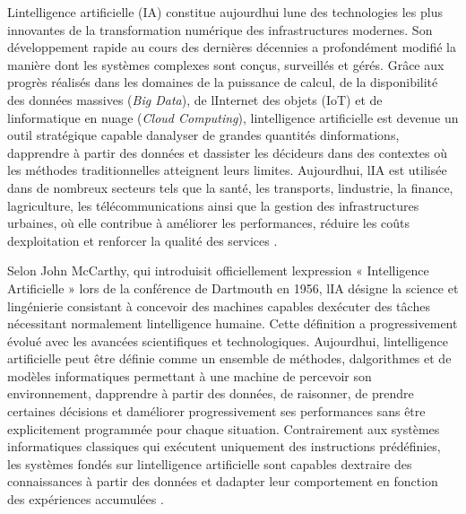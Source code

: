 \documentclass[12pt,a4paper,oneside]{report}
\begin{document}
L\textquotesingle intelligence artificielle (IA) constitue
aujourd\textquotesingle hui l\textquotesingle une des technologies les
plus innovantes de la transformation numérique des infrastructures
modernes. Son développement rapide au cours des dernières décennies a
profondément modifié la manière dont les systèmes complexes sont conçus,
surveillés et gérés. Grâce aux progrès réalisés dans les domaines de la
puissance de calcul, de la disponibilité des données massives (\emph{Big
Data}), de l\textquotesingle Internet des objets (IoT) et de
l\textquotesingle informatique en nuage (\emph{Cloud Computing}),
l\textquotesingle intelligence artificielle est devenue un outil
stratégique capable d\textquotesingle analyser de grandes quantités
d\textquotesingle informations, d\textquotesingle apprendre à partir des
données et d\textquotesingle assister les décideurs dans des contextes
où les méthodes traditionnelles atteignent leurs limites.
Aujourd\textquotesingle hui, l\textquotesingle IA est utilisée dans de
nombreux secteurs tels que la santé, les transports,
l\textquotesingle industrie, la finance, l\textquotesingle agriculture,
les télécommunications ainsi que la gestion des infrastructures
urbaines, où elle contribue à améliorer les performances, réduire les
coûts d\textquotesingle exploitation et renforcer la qualité des
services \cite{ref21}.

Selon John McCarthy, qui introduisit officiellement
l\textquotesingle expression « Intelligence Artificielle » lors de la
conférence de Dartmouth en 1956, l\textquotesingle IA désigne la science
et l\textquotesingle ingénierie consistant à concevoir des machines
capables d\textquotesingle exécuter des tâches nécessitant normalement
l\textquotesingle intelligence humaine. Cette définition a
progressivement évolué avec les avancées scientifiques et
technologiques. Aujourd\textquotesingle hui,
l\textquotesingle intelligence artificielle peut être définie comme un
ensemble de méthodes, d\textquotesingle algorithmes et de modèles
informatiques permettant à une machine de percevoir son environnement,
d\textquotesingle apprendre à partir des données, de raisonner, de
prendre certaines décisions et d\textquotesingle améliorer
progressivement ses performances sans être explicitement programmée pour
chaque situation. Contrairement aux systèmes informatiques classiques
qui exécutent uniquement des instructions prédéfinies, les systèmes
fondés sur l\textquotesingle intelligence artificielle sont capables
d\textquotesingle extraire des connaissances à partir des données et
d\textquotesingle adapter leur comportement en fonction des expériences
accumulées \cite{ref67}.
\end{document}
